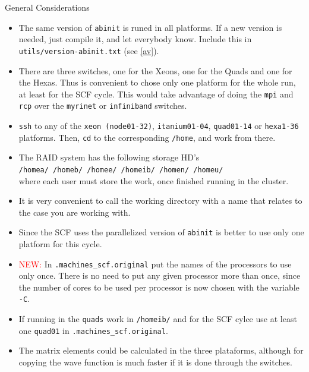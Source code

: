 \documentclass[12pt]{article}
\numberwithin{equation}{section}
\begin{document}
\centerline{General Considerations}
\begin{itemize}
\item The same version of \verb=abinit= is runed in all platforms. If
  a new version is needed, just compile it, and let everybody
  know. Include this in \verb=utils/version-abinit.txt= (see \ref{av}).

\item There are three switches, one for the Xeons, one for the Quads
  and one for the Hexas. Thus is convenient to chose only one platform
  for the whole run, at least for the SCF cycle. This would take
  advantage of doing the \verb=mpi= and \verb=rcp= over the
  \verb=myrinet= or \verb=infiniband= switches.
\item \verb=ssh= to any of the \verb=xeon (node01-32)=, \verb=itanium01-04=,
  \verb=quad01-14= or \verb=hexa1-36= platforms. Then, \verb=cd= to the
  corresponding \verb=/home=, and work from there.
\item The RAID system has the following storage HD's\\
 \verb=/homea/ /homeb/ /homee/ /homeib/ /homen/ /homeu/=\\
where each user must store the work, once finished running in the cluster. 
\item It is very convenient to call the working directory with a
name that relates to the case you are working with. 
\item Since the SCF uses the parallelized version of \verb=abinit= is
  better to use only one platform for this cycle.
\item \textcolor{red}{NEW:}
 In \verb=.machines_scf.original= put the
  names of the processors to use only once. There is no need to put any
  given processor more than once, since the number of cores to be used
  per processor is now chosen with the variable \verb=-C=. 
\item If running in the \verb=quads= work in \verb=/homeib/=
and for the SCF cylce use at least
one \verb=quad01= in \verb=.machines_scf.original=.
\item The matrix elements could be calculated in the three plataforms,
  although for copying the wave function is much faster if it is done
  through the switches.  

\end{itemize}
\end{document}
